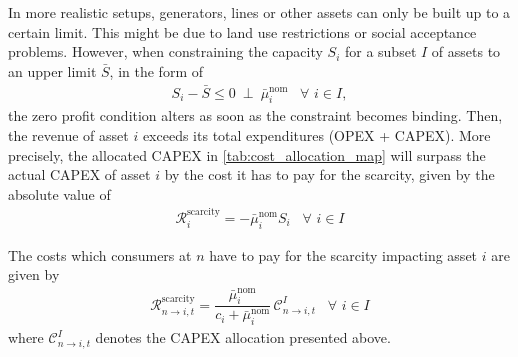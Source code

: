 \documentclass[11pt,twocolumn]{article}
\newcommand{\resultsin}[1]{\hspace{6pt} \bot  \hspace{6pt} #1}
\newcommand{\Forall}[1]{\hspace{10pt} \forall \,\, #1 }
\newcommand{\state}{s_{i,t}}
\newcommand{\capacity}{S_{i}}
\newcommand{\costfactor}{\gamma_{i,t}}
\newcommand{\capacityupper}{\bar{S}}
\newcommand{\muuppernom}{\bar{\mu}^\text{nom}_{i}}
\newcommand{\cost}{\mathcal{C}}
\newcommand{\remainingcost}{\mathcal{R}}
\newcommand{\scarcitycost}{\remainingcost^\text{scarcity}}
\newcommand{\allocatestate}[1][i, n]{A_{#1,t}}
\newcommand{\allocatecost}[1][n \rightarrow i]{\cost_{#1, t}}
\newcommand{\allocatescarcitycost}[1][n \rightarrow i]{\scarcitycost_{#1,t}}
\begin{document}
In more realistic setups, generators, lines or other assets can only be built up to a certain limit. This might be due to land use restrictions or social acceptance problems. %
However, when constraining the capacity $\capacity$  for a subset $I$ of assets to an upper limit $\capacityupper$, in the form of 
\begin{align}
    \capacity - \capacityupper \le 0 \resultsin{\muuppernom} \Forall{i \in I}
\label{eq:capacityexpansionmaximum},
\end{align}
the zero profit condition alters as soon as the constraint becomes binding. Then, the revenue of asset $i$ exceeds its total expenditures (OPEX + CAPEX). More precisely, the allocated CAPEX in \cref{tab:cost_allocation_map} will surpass the actual CAPEX of asset $i$ by the cost it has to pay for the scarcity, given by the absolute value of 
\begin{align}
    \scarcitycost_i = - \muuppernom \capacity \Forall{i \in I}
    \label{eq:scarcitycost}
\end{align}


The costs which consumers at $n$ have to pay for the scarcity impacting asset $i$ are given by 
\begin{align}
    \allocatescarcitycost = \dfrac{\muuppernom}{c_i + \muuppernom} \, \allocatecost^I \Forall{i \in I}
\end{align}
where $\allocatecost^I$ denotes the CAPEX allocation presented above. 
\end{document}
